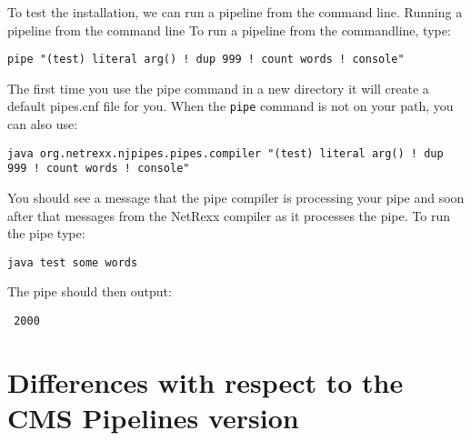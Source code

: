 To test the installation, we can run a pipeline from the command line.
Running a pipeline from the command line
 To run a pipeline from the commandline, type:
\begin{shaded}
\begin{verbatim}
pipe "(test) literal arg() ! dup 999 ! count words ! console"
\end{verbatim}
\end{shaded}
The first time you use the pipe command in a new directory it will
create a default pipes.cnf file for you. When the \texttt{pipe}
command is not on your path, you can also use:
\begin{shaded}
\begin{verbatim}
java org.netrexx.njpipes.pipes.compiler "(test) literal arg() ! dup
999 ! count words ! console"
\end{verbatim}
\end{shaded}
You should see a message that the pipe compiler is processing your pipe and soon after that messages from the NetRexx compiler as it processes the pipe.
To run the pipe type:
\begin{verbatim}
java test some words
\end{verbatim}
The pipe should then output:
\begin{verbatim}
 2000
\end{verbatim}
\chapter{Differences with respect to the CMS Pipelines version}

